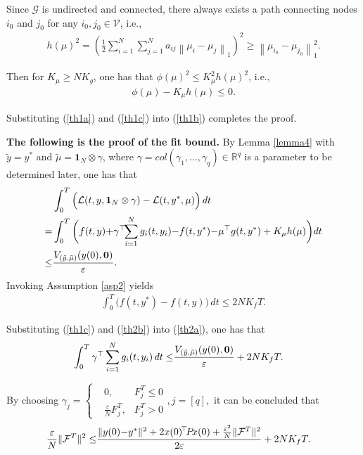 \documentclass[final,5p,times,twocolumn,authoryear]{elsarticle}
\begin{document}
	Since $\mathcal{G}$ is undirected and connected,  there always exists a path connecting nodes $i_0$ and $j_0$ for any $i_0,j_0\in\mathcal{V}$, i.e.,
	\begin{align}
		h(\mu)^2=\left(\frac{1}{2}\sum_{i=1}^N\sum_{j=1}^Na_{ij}\left\|\mu_i-\mu_j\right\|_1\right)^2\ge \left\|\mu_{i_0}-\mu_{j_0}\right\|_1^2.\label{h1}
	\end{align}
	
	Then for $K_\mu \ge NK_g$, one has that
	$\phi(\mu)^2\le K_\mu^2 h(\mu)^2$,
	i.e.,
	\begin{align}
		\phi(\mu)-K_\mu h(\mu)\le 0.\label{th1c}
	\end{align}
	
	
	Substituting (\ref{th1a}) and (\ref{th1c}) into (\ref{th1b}) completes the proof.
	
	\textbf{The following is the proof of the fit bound.}
	By Lemma \ref{lemma4} with $\tilde{y}=y^*$ and $\tilde{\mu}= \boldsymbol{1}_N \otimes \gamma$, where $\gamma=col(\gamma_1,\dots,\gamma_q)\in\mathbb{R}^q$ is a parameter to be determined later, one has that
	\begin{align}
		&\int_{0}^{T} \Big(\mathcal{L}(t,y,\boldsymbol{1}_N\otimes \gamma) - \mathcal{L}(t,y^*,\mu)\Big) \,dt\notag\\
		=
		&\int_{0}^{T} \bigg(f(t,y){+}\gamma^\top\!\! \sum_{i=1}^{N}g_i(t,y_i){-}f(t,y^*){-}\mu^\top g(t,y^*) +K_\mu h(\mu) \bigg) dt \notag\\
		\le
		& \frac{V_{(\tilde{y}, \tilde{\mu})}(y(0), \boldsymbol{0})}{\varepsilon}.\label{th2a}
	\end{align}
	Invoking Assumption \ref{asp2} yields
	\begin{align}
		\int_{0}^{T} \big(f(t,y^*)-f(t,y) \big)\,dt \le 2NK_fT.\label{th2b}
	\end{align}
	
	Substituting (\ref{th1c}) and (\ref{th2b}) into (\ref{th2a}), one has that
	\begin{align}
		\int_{0}^{T} \gamma^\top \sum_{i=1}^{N}g_i(t,y_i)\,dt \le& \frac{V_{(\tilde{y}, \tilde{\mu})}(y(0), \boldsymbol{0})}{\varepsilon} + 2NK_fT.\notag
	\end{align}
	
	By choosing
	$
		\gamma_j=\left\{
		\begin{aligned}
			& 0, &F_j^T\le 0 \\
			& \frac{\varepsilon}{N}F_j^T, &F_j^T>0
		\end{aligned}
		\right.,j=[q],
	$
	it can be concluded that
	\begin{align}
		\frac{\varepsilon}{N}\|\mathcal{F}^T\|^2\le &\frac{\|y(0){-}y^*\|^2+ 2x(0)^{\!\top} \!P\! x(0) + \frac{\varepsilon^2}{N}\|\mathcal{F}^T\|^2}{2\varepsilon} + 2NK_fT.\notag
	\end{align}
	
\end{document}
